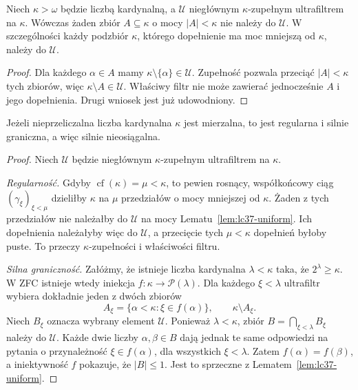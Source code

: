 \begin{lemat}
\label{lem:lc37-uniform}
Niech $\kappa>\omega$ będzie liczbą kardynalną,
a $\mathcal U$ niegłównym $\kappa$-zupełnym
ultrafiltrem na $\kappa$. Wówczas
żaden zbiór $A\subseteq\kappa$ o mocy
$|A|<\kappa$ nie należy do $\mathcal U$.
W szczególności każdy podzbiór $\kappa$,
którego dopełnienie ma moc mniejszą od
$\kappa$, należy do $\mathcal U$.
\end{lemat}
\begin{proof}
Dla każdego $\alpha\in A$ mamy
$\kappa\setminus\{\alpha\}\in\mathcal U$.
Zupełność pozwala przeciąć $|A|<\kappa$
tych zbiorów, więc
$\kappa\setminus A\in\mathcal U$.
Właściwy filtr nie może zawierać
jednocześnie $A$ i jego dopełnienia.
Drugi wniosek jest już udowodniony.
\end{proof}

\begin{twierdzenie}
\label{thm:lc37-measurable-inaccessible}
Jeżeli nieprzeliczalna liczba kardynalna $\kappa$
jest mierzalna, to jest regularna i
silnie graniczna, a więc silnie nieosiągalna.
\end{twierdzenie}
\begin{proof}
Niech $\mathcal U$ będzie niegłównym
$\kappa$-zupełnym ultrafiltrem na $\kappa$.

\emph{Regularność.} Gdyby
$\operatorname{cf}(\kappa)=\mu<\kappa$,
to pewien rosnący, współkońcowy ciąg
$(\gamma_\xi)_{\xi<\mu}$ dzieliłby
$\kappa$ na $\mu$ przedziałów
o mocy mniejszej od $\kappa$.
Żaden z tych przedziałów nie należałby
do $\mathcal U$ na mocy
Lematu~\ref{lem:lc37-uniform}.
Ich dopełnienia należałyby więc do
$\mathcal U$, a przecięcie tych
$\mu<\kappa$ dopełnień byłoby puste.
To przeczy $\kappa$-zupełności
i właściwości filtru.

\emph{Silna graniczność.} Załóżmy,
że istnieje liczba kardynalna $\lambda<\kappa$
taka, że $2^\lambda\ge\kappa$.
W ZFC istnieje wtedy iniekcja
$f:\kappa\to\mathcal P(\lambda)$.
Dla każdego $\xi<\lambda$ ultrafiltr
wybiera dokładnie jeden z dwóch zbiorów
\[
 A_\xi=\{\alpha<\kappa:\xi\in f(\alpha)\},
 \qquad \kappa\setminus A_\xi.
\]
Niech $B_\xi$ oznacza wybrany element
$\mathcal U$. Ponieważ $\lambda<\kappa$,
zbiór $B=\bigcap_{\xi<\lambda}B_\xi$
należy do $\mathcal U$.
Każde dwie liczby $\alpha,\beta\in B$
dają jednak te same odpowiedzi
na pytania o przynależność
$\xi\in f(\alpha)$, dla wszystkich
$\xi<\lambda$. Zatem
$f(\alpha)=f(\beta)$, a iniektywność
$f$ pokazuje, że $|B|\le1$.
Jest to sprzeczne z
Lematem~\ref{lem:lc37-uniform}.
\end{proof}

